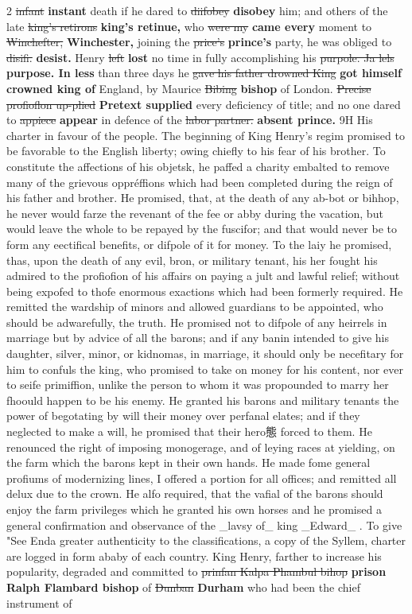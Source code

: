 \documentclass[10pt]{article}
\begin{document}
\begin{multicols}{2}
\sout{infant} \textbf{instant} death if he dared to \sout{diifobey} \textbf{disobey} him; and others of the late \sout{king’s retirons} \textbf{king's retinue,} who \sout{were my} \textbf{came every} moment to \sout{Winchefter,} \textbf{Winchester,} joining the \sout{price’s} \textbf{prince's} party, he was obliged to \sout{disifi.} \textbf{desist.} Henry \sout{left} \textbf{lost} no time in fully accomplishing his \sout{purpole. Ja lels} \textbf{purpose. In less} than three days he \sout{gave his father drowned King} \textbf{got himself crowned king of} England, by Maurice \sout{Bibing} \textbf{bishop} of London. \sout{Precise profioflon up-plied} \textbf{Pretext supplied} every deficiency of title; and no one dared to \sout{appiece} \textbf{appear} in defence of the \sout{labor partner.} \textbf{absent prince.} 9H His charter in favour of the people. The beginning of King Henry's regim promised to be favorable to the English liberty; owing chiefly to his fear of his brother. To constitute the affections of his objetsk, he paffed a charity embalted to remove many of the grievous oppréffions which had been completed during the reign of his father and brother. He promised, that, at the death of any ab-bot or bihhop, he never would farze the revenant of the fee or abby during the vacation, but would leave the whole to be repayed by the fuscifor; and that would never be to form any eectifical benefits, or difpole of it for money. To the laiy he promised, thas, upon the death of any evil, bron, or military tenant, his her fought his admired to the profiofion of his affairs on paying a jult and lawful relief; without being expofed to thofe enormous exactions which had been formerly required. He remitted the wardship of minors and allowed guardians to be appointed, who should be adwarefully, the truth. He promised not to difpole of any heirrels in marriage but by advice of all the barons; and if any banin intended to give his daughter, silver, minor, or kidnomas, in marriage, it should only be necefitary for him to confuls the king, who promised to take on money for his content, nor ever to seife primiffion, unlike the person to whom it was propounded to marry her fhoould happen to be his enemy. He granted his barons and military tenants the power of begotating by will their money over perfanal elates; and if they neglected to make a will, he promised that their hero態 forced to them. He renounced the right of imposing monogerage, and of leying races at yielding, on the farm which the barons kept in their own hands. He made fome general profiums of modernizing lines, I offered a portion for all offices; and remitted all delux due to the crown. He alfo required, that the vafial of the barons should enjoy the farm privileges which he granted his own horses and he promised a general confirmation and observance of the \_lavsy of\_ king \_Edward\_ . To give "See Enda greater authenticity to the classifications, a copy of the Syllem, charter are logged in form ababy of each country. King Henry, farther to increase his popularity, degraded and committed to \sout{prinfan Kalpa Phambul bihop} \textbf{prison Ralph Flambard bishop} of \sout{Dunban} \textbf{Durham} who had been the chief instrument of 
\end{multicols}
\end{document}
